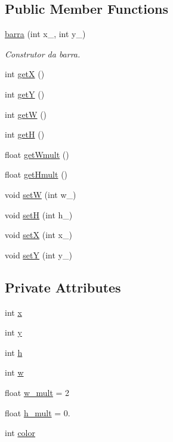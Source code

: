 \subsection*{Public Member Functions}
\begin{DoxyCompactItemize}
\item 
\hyperlink{classbarra_a5acfb9b82a30794e040d4f156562317c}{barra} (int x\+\_\+, int y\+\_\+)
\begin{DoxyCompactList}\small\item\em Construtor da barra. \end{DoxyCompactList}\item 
int \hyperlink{classbarra_a2f3787aab4304ccd3e5ac813d5387f26}{getX} ()
\item 
int \hyperlink{classbarra_a5eed7412b3afaa38f74ab8ce2e3cf80c}{getY} ()
\item 
int \hyperlink{classbarra_aad00b16b2f10c8f2e9b11981c44037c6}{getW} ()
\item 
int \hyperlink{classbarra_a640467fe10e4d76eba2cdddf560ac08a}{getH} ()
\item 
float \hyperlink{classbarra_a2e8656df299ddc913bcacac2505a6733}{get\+Wmult} ()
\item 
float \hyperlink{classbarra_ac3e797dcb0cfdeba9cb3ff813f16021e}{get\+Hmult} ()
\item 
void \hyperlink{classbarra_a1653a2f02c5c429afac46845ab35b50f}{setW} (int w\+\_\+)
\item 
void \hyperlink{classbarra_a527670e645cee76fd476f0fd731040a4}{setH} (int h\+\_\+)
\item 
void \hyperlink{classbarra_a9b3d595be05ea5ddb56f3f0b598dbb0b}{setX} (int x\+\_\+)
\item 
void \hyperlink{classbarra_a3571249441c47aa48766ab10fec170ad}{setY} (int y\+\_\+)
\end{DoxyCompactItemize}
\subsection*{Private Attributes}
\begin{DoxyCompactItemize}
\item 
int \hyperlink{classbarra_a60f0c711fd29434f3fb07a3f584a83a1}{x}
\item 
int \hyperlink{classbarra_a93b604008af3593ac1b80366c387f2e9}{y}
\item 
int \hyperlink{classbarra_add2a64a98c1781d1cc9b7b1f744df1a5}{h}
\item 
int \hyperlink{classbarra_a31fd53ae11742f912eb9e0b20707cb82}{w}
\item 
float \hyperlink{classbarra_a7ca620e27ef6e75eb8dfcc05a738a97c}{w\+\_\+mult} = 2
\item 
float \hyperlink{classbarra_a6ee439263b66198984d59f0ef128e7a6}{h\+\_\+mult} = 0.
\item 
int \hyperlink{classbarra_a7234eb8aa0b635f9c1fb0456ebd7901c}{color}
\end{DoxyCompactItemize}


